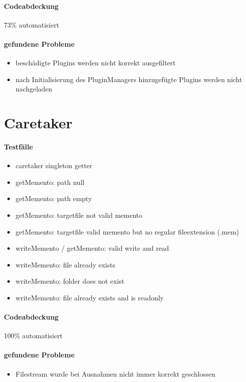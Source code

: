 \paragraph*{Codeabdeckung}
73\% automatisiert
\paragraph*{gefundene Probleme}
\begin{itemize}
\item beschädigte Plugins werden nicht korrekt ausgefiltert
\item nach Initialisierung des PluginManagers hinzugefügte Plugins werden nicht nachgeladen
\end{itemize}


\section{Caretaker}
\paragraph*{Testfälle}
\begin{itemize}
\item caretaker singleton getter
\item getMemento: path null
\item getMemento: path empty
\item getMemento: targetfile not valid memento
\item getMemento: targetfile valid memento but no regular fileextension (.mem)
\item writeMemento / getMemento: valid write and read
\item writeMemento: file already exists
\item writeMemento: folder does not exist
\item writeMemento: file already exists and is readonly
\end{itemize}
\paragraph*{Codeabdeckung}
100\% automatisiert
\paragraph*{gefundene Probleme}
\begin{itemize}
\item Filestream wurde bei Ausnahmen nicht immer korrekt geschlossen
\end{itemize}



